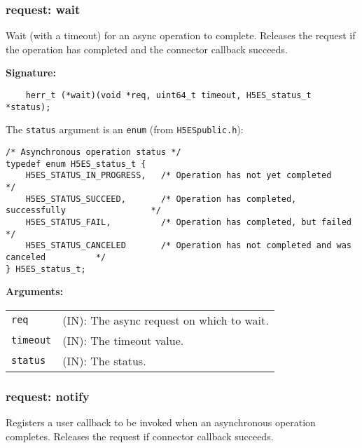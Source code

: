 \subsubsection{request: wait}
Wait (with a timeout) for an async operation to complete. Releases the request if the operation has completed and the connector callback succeeds.

\begin{mdframed}[style=bgbox]
\textbf{Signature:}
\begin{lstlisting}
    herr_t (*wait)(void *req, uint64_t timeout, H5ES_status_t *status);          
\end{lstlisting}

The \texttt{status} argument is an \texttt{enum} (from \texttt{H5ESpublic.h}):
\begin{lstlisting}
/* Asynchronous operation status */                                              
typedef enum H5ES_status_t {                                                     
    H5ES_STATUS_IN_PROGRESS,   /* Operation has not yet completed                       */
    H5ES_STATUS_SUCCEED,       /* Operation has completed, successfully                 */
    H5ES_STATUS_FAIL,          /* Operation has completed, but failed                   */
    H5ES_STATUS_CANCELED       /* Operation has not completed and was canceled          */
} H5ES_status_t;
\end{lstlisting} 
    
\textbf{Arguments:}\\
\begin{tabular}{l p{13.5cm}}
  \texttt{req} & (IN): The async request on which to wait.\\
  \texttt{timeout} & (IN): The timeout value.\\
  \texttt{status} & (IN): The status.\\
\end{tabular}
\end{mdframed}

\subsubsection{request: notify}
Registers a user callback to be invoked when an asynchronous operation completes. Releases the request if connector callback succeeds.

